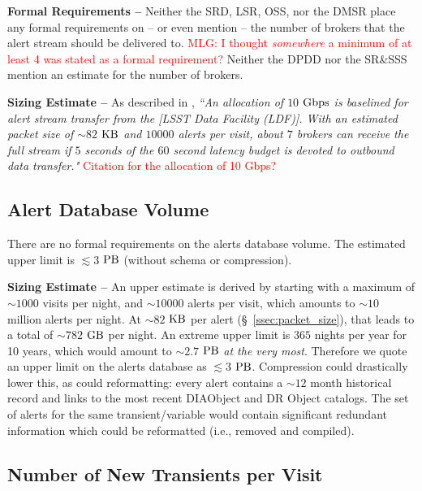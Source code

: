 \documentclass[DM,authoryear,toc]{lsstdoc}
\begin{document}
{\bf Formal Requirements --} Neither the SRD, LSR, OSS, nor the DMSR place any formal requirements on -- or even mention -- the number of brokers that the alert stream should be delivered to. \textcolor{red}{MLG: I thought {\it somewhere} a minimum of at least 4 was stated as a formal requirement?} Neither the DPDD nor the SR\&SSS mention an estimate for the number of brokers. 

{\bf Sizing Estimate --} As described in , {\it ``An allocation of $10$ $\rm Gbps$ is baselined for alert stream transfer from the [LSST Data Facility (LDF)]. With an estimated packet size of $\sim82$ $\rm KB$ and $10000$ alerts per visit, about $7$ brokers can receive the full stream if $5$ seconds of the $60$ second latency budget is devoted to outbound data transfer."} \textcolor{red}{Citation for the allocation of 10 Gbps?}


\subsection{Alert Database Volume}\label{ssec:adb_volume}

There are no formal requirements on the alerts database volume. The estimated upper limit is $\lesssim3$ $\rm PB$ (without schema or compression).

{\bf Sizing Estimate --} An upper estimate is derived by starting with a maximum of $\sim1000$ visits per night, and $\sim10000$ alerts per visit, which amounts to $\sim 10$ million alerts per night. At $\sim82$ $\rm KB$ per alert (\S~\ref{ssec:packet_size}), that leads to a total of $\sim782$ $\rm GB$ per night. An extreme upper limit is $365$ nights per year for 10 years, which would amount to $\sim2.7$ $\rm PB$ {\it at the very most}. Therefore we quote an upper limit on the alerts database as $\lesssim3$ $\rm PB$. Compression could drastically lower this, as could reformatting: every alert contains a $\sim12$ month historical record and links to the most recent DIAObject and DR Object catalogs. The set of alerts for the same transient/variable would contain significant redundant information which could be reformatted (i.e., removed and compiled).


\subsection{Number of New Transients per Visit}
\end{document}
